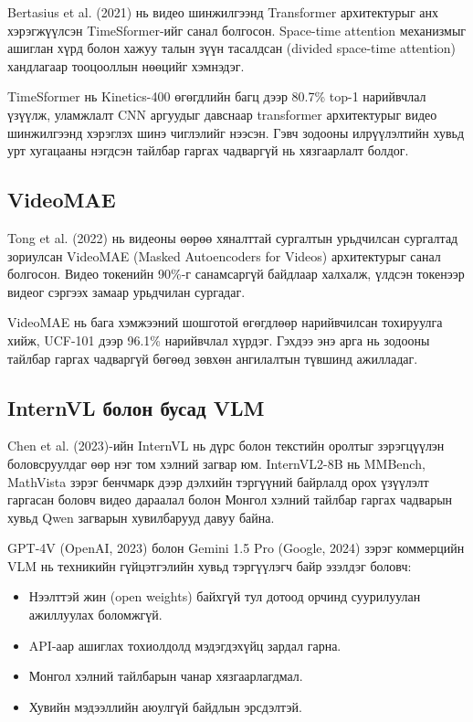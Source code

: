 Bertasius et al. (2021) нь видео шинжилгээнд Transformer архитектурыг анх хэрэгжүүлсэн TimeSformer-ийг санал болгосон. Space-time attention механизмыг ашиглан хүрд болон хажуу талын зүүн тасалдсан (divided space-time attention) хандлагаар тооцооллын нөөцийг хэмнэдэг.

TimeSformer нь Kinetics-400 өгөгдлийн багц дээр 80.7\% top-1 нарийвчлал үзүүлж, уламжлалт CNN аргуудыг давснаар transformer архитектурыг видео шинжилгээнд хэрэглэх шинэ чиглэлийг нээсэн. Гэвч зодооны илрүүлэлтийн хувьд урт хугацааны нэгдсэн тайлбар гаргах чадваргүй нь хязгаарлалт болдог.

\subsection*{VideoMAE}

Tong et al. (2022) нь видеоны өөрөө хяналттай сургалтын урьдчилсан сургалтад зориулсан VideoMAE (Masked Autoencoders for Videos) архитектурыг санал болгосон. Видео токенийн 90\%-г санамсаргүй байдлаар халхалж, үлдсэн токенээр видеог сэргээх замаар урьдчилан сургадаг.

VideoMAE нь бага хэмжээний шошготой өгөгдлөөр нарийвчилсан тохируулга хийж, UCF-101 дээр 96.1\% нарийвчлал хүрдэг. Гэхдээ энэ арга нь зодооны тайлбар гаргах чадваргүй бөгөөд зөвхөн ангилалтын түвшинд ажилладаг.

\subsection*{InternVL болон бусад VLM}

Chen et al. (2023)-ийн InternVL нь дүрс болон текстийн оролтыг зэрэгцүүлэн боловсруулдаг өөр нэг том хэлний загвар юм. InternVL2-8B нь MMBench, MathVista зэрэг бенчмарк дээр дэлхийн тэргүүний байрлалд орох үзүүлэлт гаргасан боловч видео дараалал болон Монгол хэлний тайлбар гаргах чадварын хувьд Qwen загварын хувилбарууд давуу байна.

GPT-4V (OpenAI, 2023) болон Gemini 1.5 Pro (Google, 2024) зэрэг коммерцийн VLM нь техникийн гүйцэтгэлийн хувьд тэргүүлэгч байр эзэлдэг боловч:

\begin{itemize}
    \item Нээлттэй жин (open weights) байхгүй тул дотоод орчинд суурилуулан ажиллуулах боломжгүй.
    \item API-аар ашиглах тохиолдолд мэдэгдэхүйц зардал гарна.
    \item Монгол хэлний тайлбарын чанар хязгаарлагдмал.
    \item Хувийн мэдээллийн аюулгүй байдлын эрсдэлтэй.
\end{itemize}

